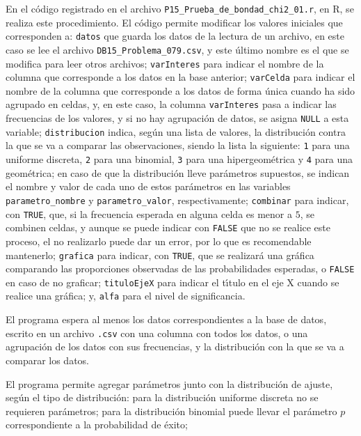 \begin{solucion}
 En el c\'odigo registrado en el archivo \texttt{P15\_Prueba\_de\_bondad\_chi2\_01.r}, en R,
 se realiza este procedimiento.
 El c\'odigo permite modificar los valores iniciales que corresponden a:
 \texttt{datos} que guarda los datos de la lectura de un archivo,
 en este caso se lee el archivo \texttt{DB15\_Problema\_079.csv},
 y este \'ultimo nombre es el que se modifica para leer otros archivos;
 \texttt{varInteres} para indicar el nombre de la columna que corresponde a los datos en la base anterior;
 \texttt{varCelda} para indicar el nombre de la columna que corresponde
 a los datos de forma \'unica cuando ha sido agrupado en celdas,
 y, en este caso, la columna \texttt{varInteres} pasa a indicar
 las frecuencias de los valores, y si no hay agrupaci\'on de datos, 
 se asigna \texttt{NULL} a esta variable;
 \texttt{distribucion} indica, seg\'un una lista de valores,
 la distribuci\'on contra la que se va a comparar las observaciones,
 siendo la lista la siguiente: \texttt{1} para una uniforme discreta,
 \texttt{2} para una binomial, \texttt{3} para una hipergeom\'etrica y
 \texttt{4} para una geom\'etrica;
 en caso de que la distribuci\'on lleve par\'ametros supuestos,
 se indican el nombre y valor de cada uno de estos par\'ametros
 en las variables \texttt{parametro\_nombre} y \texttt{parametro\_valor},
 respectivamente;
 \texttt{combinar} para indicar, con \texttt{TRUE},
 que, si la frecuencia esperada en alguna celda es menor a $5$,
 se combinen celdas, y aunque se puede indicar con \texttt{FALSE}
 que no se realice este proceso, el no realizarlo puede dar
 un error, por lo que es recomendable mantenerlo;
 \texttt{grafica} para indicar, con \texttt{TRUE}, que se realizar\'a
 una gr\'afica comparando las proporciones observadas
 de las probabilidades esperadas,
 o \texttt{FALSE} en caso de no graficar;
 \texttt{tituloEjeX} para indicar el t\'{\i}tulo en el eje X
 cuando se realice una gr\'afica;
 y, \texttt{alfa} para el nivel de significancia.
 \par 
 El programa espera al menos los datos correspondientes a la base
 de datos, escrito en un archivo \texttt{.csv} con una columna
 con todos los datos, o una agrupaci\'on de los datos con sus frecuencias, 
 y la distribuci\'on con la que se va a comparar los datos.
 \par 
 El programa permite agregar par\'ametros junto con la distribuci\'on
 de ajuste, seg\'un el tipo de distribuci\'on:
 para la distribuci\'on uniforme discreta no se requieren par\'ametros;
 para la distribuci\'on binomial puede llevar el par\'ametro $p$
 correspondiente a la probabilidad de \'exito;

\end{solucion}
